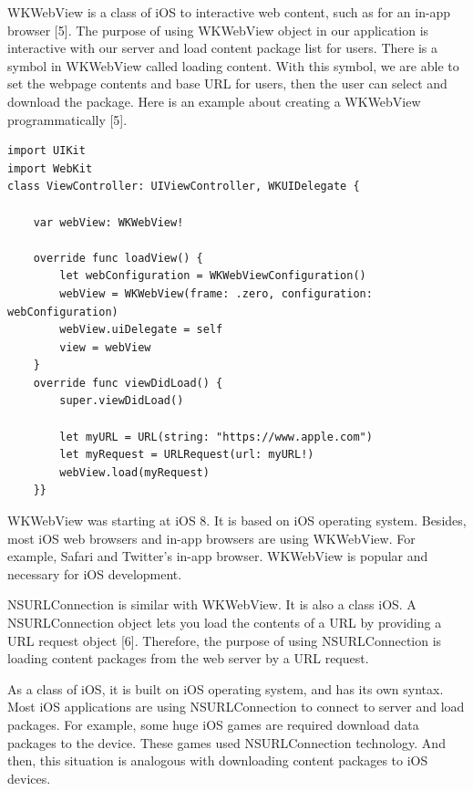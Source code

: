 \documentclass[letterpaper, 10pt,titlepage]{article}
\begin{document}
WKWebView is a class of iOS to interactive web content, such as for an in-app browser [5]. The purpose of using WKWebView object in our application is interactive with our server and load content package list for users. There is a symbol in WKWebView called loading content. With this symbol, we are able to set the webpage contents and base URL for users, then the user can select and download the package. Here is an example about creating a WKWebView programmatically [5].

\begin{verbatim}
import UIKit
import WebKit
class ViewController: UIViewController, WKUIDelegate {
    
    var webView: WKWebView!
    
    override func loadView() {
        let webConfiguration = WKWebViewConfiguration()
        webView = WKWebView(frame: .zero, configuration: webConfiguration)
        webView.uiDelegate = self
        view = webView
    }
    override func viewDidLoad() {
        super.viewDidLoad()
        
        let myURL = URL(string: "https://www.apple.com")
        let myRequest = URLRequest(url: myURL!)
        webView.load(myRequest)
    }}
\end{verbatim}


WKWebView was starting at iOS 8. It is based on iOS operating system. Besides, most iOS web browsers and in-app browsers are using WKWebView. For example, Safari and Twitter’s in-app browser. WKWebView is popular and necessary for iOS development.


NSURLConnection is similar with WKWebView. It is also a class iOS. A NSURLConnection object lets you load the contents of a URL by providing a URL request object [6]. Therefore, the purpose of using NSURLConnection is loading content packages from the web server by a URL request. 


As a class of iOS, it is built on iOS operating system, and has its own syntax. Most iOS applications are using NSURLConnection to connect to server and load packages. For example, some huge iOS games are required download data packages to the device. These games used NSURLConnection technology. And then, this situation is analogous with downloading content packages to iOS devices.
\end{document}
